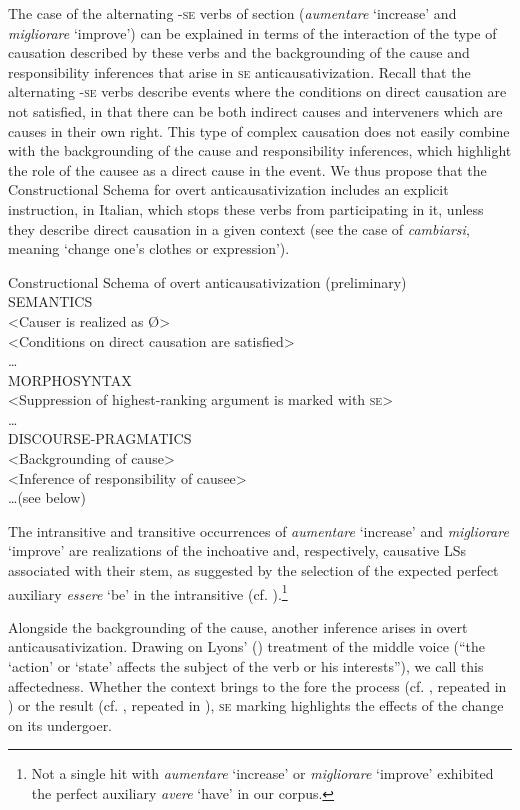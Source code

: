 \documentclass[output=paper,colorlinks,citecolor=brown
]{langscibook}
\begin{document}
The case of the alternating -\textsc{se} verbs of section  (\textit{aumentare} ‘increase’ and \textit{migliorare} ‘improve’) can be explained in terms of the interaction of the type of causation described by these verbs and the backgrounding of the cause and responsibility inferences that arise in \textsc{se} anticausativization. Recall that the alternating -\textsc{se} verbs describe events where the conditions on direct causation are not satisfied, in that there can be both indirect causes and interveners which are causes in their own right. This type of complex causation does not easily combine with the backgrounding of the cause and responsibility inferences, which highlight the role of the causee as a direct cause in the event. We thus propose that the Constructional Schema for overt anticausativization includes an explicit instruction, in Italian, which stops these verbs from participating in it, unless they describe direct causation in a given context (see the case of \textit{cambiarsi}, meaning ‘change one’s clothes or expression’).

\ea \label{bentley_example_54}
Constructional Schema of overt anticausativization (preliminary)\\
SEMANTICS\\
<Causer is realized as Ø>\\
<Conditions on direct causation are satisfied>\\
 \ldots \\
MORPHOSYNTAX\\
<Suppression of highest-ranking argument is marked with \textsc{se}>\\
 \ldots \\
DISCOURSE-PRAGMATICS\\
<Backgrounding of cause>\\
<Inference of responsibility of causee>\\
 \ldots  (see below)
\z

The intransitive and transitive occurrences of \textit{aumentare} ‘increase’ and \textit{migliorare} ‘improve’ are realizations of the inchoative and, respectively, causative LSs associated with their stem, as suggested by the selection of the expected perfect auxiliary \textit{essere} ‘be’ in the intransitive (cf. ).\footnote{Not a single hit with \textit{aumentare} ‘increase’ or \textit{migliorare} ‘improve’ exhibited the perfect auxiliary \textit{avere} ‘have’ in our corpus.}

Alongside the backgrounding of the cause, another inference arises in overt anticausativization. Drawing on Lyons’ (\citeyear[373]{lyons1969introduction}) treatment of the middle voice (“the ‘action’ or ‘state’ affects the subject of the verb or his interests”), we call this affectedness. Whether the context brings to the fore the process (cf. , repeated in ) or the result (cf. , repeated in ), \textsc{se} marking highlights the effects of the change on its undergoer. 
\end{document}
